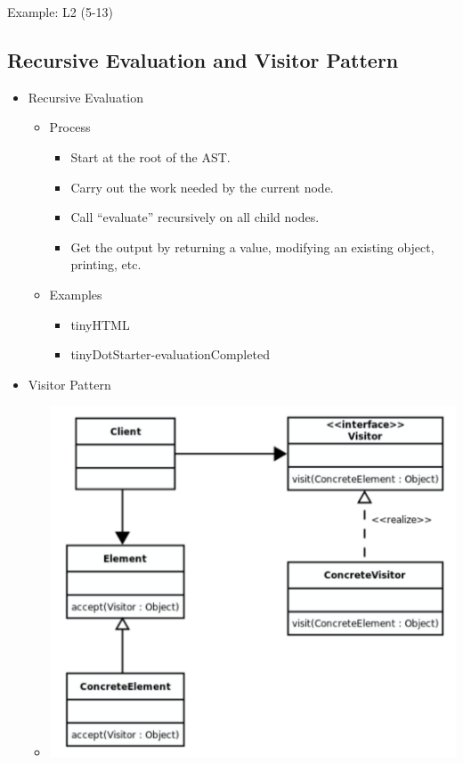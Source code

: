 \documentclass{article}
\begin{document}
Example: L2 (5-13)

\subsection{Recursive Evaluation and Visitor Pattern}

\begin{itemize}
    \item Recursive Evaluation
    \begin{itemize}
        \item Process
        \begin{itemize}
            \item Start at the root of the AST.
            \item Carry out the work needed by the current node.
            \item Call ``evaluate'' recursively on all child nodes.
            \item Get the output by returning a value, modifying an existing object, printing, etc.
        \end{itemize}
        \item Examples
        \begin{itemize}
            \item tinyHTML
            \item tinyDotStarter-evaluationCompleted
        \end{itemize}
    \end{itemize}
    \item Visitor Pattern
    \begin{itemize}
        \item
        \begin{minipage}{\linewidth}
            \centering
            \includegraphics[width=\textwidth]{visitor_pattern}

\end{minipage}
\end{itemize}
\end{itemize}
\end{document}

